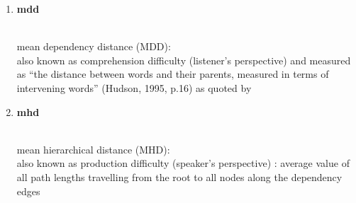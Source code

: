 \begin{enumerate}
	\item \hypertarget{ft:mdd}{\textbf{mdd}} \\
		mean dependency distance (MDD): \\
		also known as comprehension difficulty (listener's perspective) and measured as ``the distance between words and their parents, measured in terms of intervening words'' (Hudson, 1995, p.16) as quoted by \citet[p.162]{Jing2015}
	
	\item \hypertarget{ft:mhd}{\textbf{mhd}} \\
		mean hierarchical distance (MHD): \\
		also known as production difficulty (speaker's perspective) :
		average value of all path lengths travelling from the root to all nodes along the dependency edges \cite[p.164]{Jing2015}
		
		
		
	

\end{enumerate}
